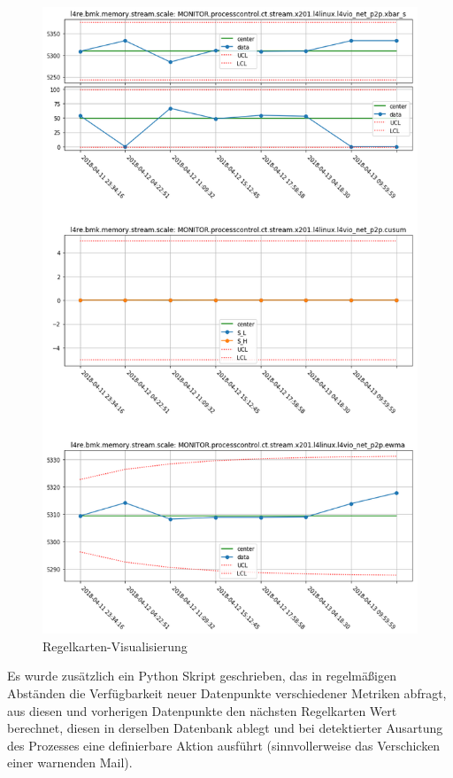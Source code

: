 \begin{figure}
  \centering
  \includegraphics[scale=.6]{../resources/control_charts.png}
  \caption{Regelkarten-Visualisierung}
  \label{fig:control_charts}
\end{figure}

Es wurde zusätzlich ein Python Skript geschrieben, das in regelmäßigen
Abständen die Verfügbarkeit neuer Datenpunkte verschiedener Metriken abfragt,
aus diesen und vorherigen Datenpunkte den nächsten Regelkarten Wert
berechnet, diesen in derselben Datenbank ablegt und bei detektierter Ausartung
des Prozesses eine definierbare Aktion ausführt (sinnvollerweise das
Verschicken einer warnenden Mail).
